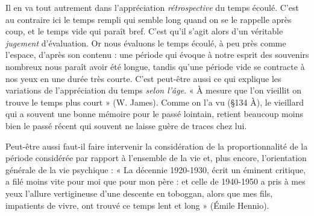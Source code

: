 Il en va tout autrement dans l'appréciation {\it rétrospective} du temps
écoulé. C’est au contraire ici le temps rempli qui semble long quand
on se le rappelle après coup, et le temps vide qui paraît bref. C’est
qu’il s’agit alors d’un véritable {\it jugement} d'évaluation. Or nous évaluons
le temps écoulé, à peu près comme l’espace, d’après son contenu :
une période qui évoque à notre esprit des souvenirs nombreux nous
paraît avoir été longue, tandis qu’une période vide se contracte à nos
yeux en une durée très courte. C’est peut-être aussi ce qui explique
les variations de l’appréciation du temps {\it selon l’âge}. « À mesure que
l'on vieillit on trouve le temps plus court » (W. James). Comme
on l’a vu (\S 134 À), le vieillard qui a souvent une bonne mémoire pour
le passé lointain, retient beaucoup moins bien le passé récent qui
souvent ne laisse guère de traces chez lui.

\vspace{0.24cm}
{\footnotesize Peut-être aussi faut-il faire intervenir la considération de la
proportionnalité de la période considérée par rapport à l’ensemble
de la vie et, plus encore, l'orientation générale de la vie psychique :
« La décennie 1920-1930, écrit un éminent critique, a filé moins
vite pour moi que pour mon père : et celle de 1940-1950 a pris à mes
yeux l'allure vertigineuse d'une descente en toboggan, alors que mes
fils, impatients de vivre, ont trouvé ce temps lent et long » (Émile Hennio).}

